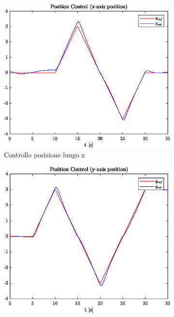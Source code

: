 \begin{figure}
	\centering
	\begin{subfigure}{0.45\textwidth}
		\centering
		\includegraphics[width=1\textwidth]{Simulazioni/Figure/PID/SQUARE/PositionControlXPos}
		\caption{Controllo posizione lungo x}
	\end{subfigure}
	\hfill
	\begin{subfigure}{0.45\textwidth}
		\centering
		\includegraphics[width=1\textwidth]{Simulazioni/Figure/PID/SQUARE/PositionControlYPos}

\end{subfigure}
\end{figure}
